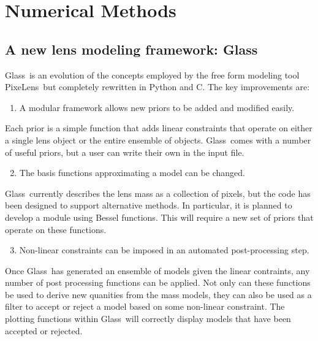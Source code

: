 \documentclass[onecolumn,galley]{mn2e}
\newcommand{\Glass}{{\sc Glass}}
\newcommand{\PixeLens}{{\sc PixeLens}}
\begin{document}
\section{Numerical Methods} 

\subsection{A new lens modeling framework: \Glass}

\Glass\ is an evolution of the concepts employed by the free form modeling tool
\PixeLens\ but completely rewritten in Python and C. The key improvements are:
%
\begin{enumerate}
  \setcounter{enumi}{0}
  \item A modular framework allows new priors to be added and modified easily.
\end{enumerate}
%
Each prior is a simple function that adds linear constraints that operate on either
a single lens object or the entire ensemble of objects. \Glass\ comes with a number
of useful priors, but a user can write their own in the input file.
%
\begin{enumerate}
  \setcounter{enumi}{1}
  \item The basis functions approximating a model can be changed. 
\end{enumerate}
%
\Glass\ currently describes the lens mass as a collection of pixels, but the code
has been designed to support alternative methods. In particular, it is planned
to develop a module using Bessel functions. This will require a new set of 
priors that operate on these functions.
%
\begin{enumerate}
  \setcounter{enumi}{2}
  \item Non-linear constraints can be imposed in an automated post-processing step. 
\end{enumerate}
%
Once \Glass\ has generated an ensemble of models given the linear contraints, any number
of post processing functions can be applied. Not only can these functions be used to
derive new quanities from the mass models, they can also be used as a filter to 
accept or reject a model based on some non-linear constraint. The plotting functions
within \Glass\ will correctly display models that have been accepted or rejected.
\end{document}
